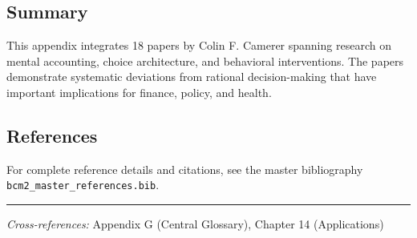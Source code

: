 \subsection{Summary}

This appendix integrates 18 papers by Colin F. Camerer
spanning research on mental accounting, choice architecture, and behavioral
interventions. The papers demonstrate systematic deviations from rational
decision-making that have important implications for finance, policy, and health.

\subsection{References}

For complete reference details and citations, see the master bibliography
\texttt{bcm2\_master\_references.bib}.

\vspace{1em}
\hrule
\vspace{0.5em}

\noindent\textit{Cross-references:}
Appendix G (Central Glossary), Chapter 14 (Applications)
